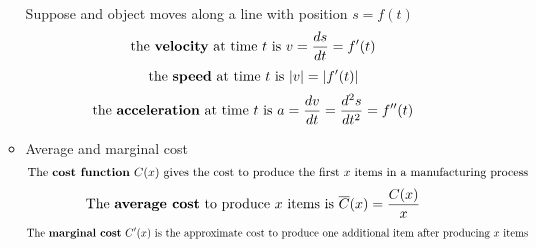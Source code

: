 \documentclass{article}
\begin{document}
\begin{itemize}
\begin{itemize}
        \\ Suppose and object moves along a line with position $s = f(t)$
        $$\text{the \textbf{velocity} at time } t \text{ is } v = \frac{ds}{dt} = f'(t)$$
        $$\text{the \textbf{speed} at time } t \text{ is } |v| = |f'(t)|$$
        $$\text{the \textbf{acceleration} at time } t \text{ is } a = \frac{dv}{dt} = \frac{d^2s}{dt^2} = f''(t)$$
        \item Average and marginal cost
        $$\text{The \textbf{cost function} } C(x) \text{ gives the cost to produce the first } x \text{ items in a manufacturing process}$$
        $$\text{The \textbf{average cost} to produce } x \text{ items is } \overline{C}(x) = \frac{C(x)}{x}$$
        $$\text{The \textbf{marginal cost} } C'(x) \text{ is the approximate cost to produce one additional item after producing } x \text{ items}$$
    \end{itemize}
\end{itemize}
\end{document}

